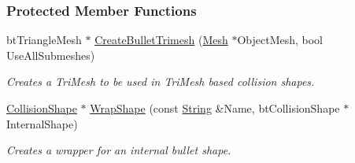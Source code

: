 \subsubsection*{Protected Member Functions}
\begin{DoxyCompactItemize}
\item 
\hypertarget{classMezzanine_1_1CollisionShapeManager_a689b902e3acec0bc4998dc341830705b}{
btTriangleMesh $\ast$ \hyperlink{classMezzanine_1_1CollisionShapeManager_a689b902e3acec0bc4998dc341830705b}{CreateBulletTrimesh} (\hyperlink{classMezzanine_1_1Mesh}{Mesh} $\ast$ObjectMesh, bool UseAllSubmeshes)}
\label{classMezzanine_1_1CollisionShapeManager_a689b902e3acec0bc4998dc341830705b}

\begin{DoxyCompactList}\small\item\em Creates a TriMesh to be used in TriMesh based collision shapes. \item\end{DoxyCompactList}\item 
\hypertarget{classMezzanine_1_1CollisionShapeManager_a4c794301b694edd546b46e1599b3d4f0}{
\hyperlink{classMezzanine_1_1CollisionShape}{CollisionShape} $\ast$ \hyperlink{classMezzanine_1_1CollisionShapeManager_a4c794301b694edd546b46e1599b3d4f0}{WrapShape} (const \hyperlink{namespaceMezzanine_acf9fcc130e6ebf08e3d8491aebcf1c86}{String} \&Name, btCollisionShape $\ast$InternalShape)}
\label{classMezzanine_1_1CollisionShapeManager_a4c794301b694edd546b46e1599b3d4f0}

\begin{DoxyCompactList}\small\item\em Creates a wrapper for an internal bullet shape. \item\end{DoxyCompactList}\end{DoxyCompactItemize}
